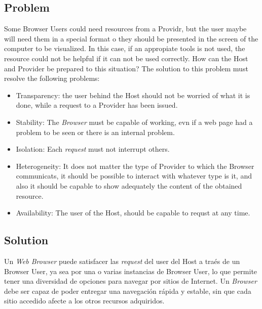 \documentclass{sig-alternate-05-2015}
\begin{document}
  \subsection*{Problem}
  Some Browser Users could need resources from a Providr, but the user maybe will need them in a special format o they should be presented in the screen of the computer to be visualized. In this case, if an appropiate tools is not used, the resource could not be helpful if it can not be used correctly. How can the Host and Provider be prepared to this situation? The solution to this problem must resolve the following problems:
  \begin{itemize}
    \item Transparency: the user behind the Host should not be worried of what it is done, while a request to a Provider has been issued. 
    \item Stability: The \textit{Browser} must be capable of working, evn if a web page had a problem to be seen or there is an internal problem.
    \item Isolation: Each \textit{request} must not interrupt others.
    \item Heterogeneity: It does not matter the type of Provider to which the Browser communicats, it should be possible to interact with whatever type is it, and also it should be capable to show adequately the content of the obtained resource.
    \item Availability: The user of the Host, should be capable to requst at any time.
  \end{itemize}

  \subsection*{Solution}
  Un \textit{Web Browser} puede satisfacer las \textit{request} del user del Host a traés de un Browser User, ya sea por una o varias instancias de Browser User, lo que permite tener una diversidad de opciones para navegar por sitios de Internet. Un \textit{Browser} debe ser capaz de poder entregar una navegación rápida y estable, sin que cada sitio accedido afecte a los otros recursos adquiridos.
\end{document}
